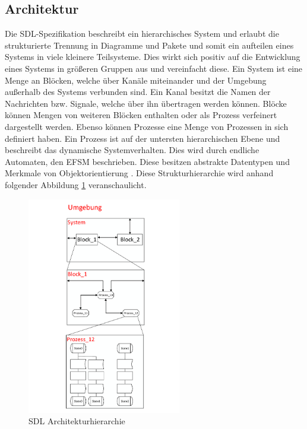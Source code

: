 \subsection{Architektur}
\label{ssc:Architektur}
Die \ac{SDL}-Spezifikation beschreibt ein hierarchisches System und erlaubt die strukturierte Trennung in Diagramme und Pakete und somit ein aufteilen eines Systems in viele kleinere Teilsysteme. Dies wirkt sich positiv auf die Entwicklung eines Systems in größeren Gruppen aus und vereinfacht diese. Ein System ist eine Menge an Blöcken, welche über Kanäle miteinander und der Umgebung außerhalb des Systems verbunden sind. Ein Kanal besitzt die Namen der Nachrichten bzw. Signale, welche über ihn übertragen werden können. Blöcke können Mengen von weiteren Blöcken enthalten oder als Prozess verfeinert dargestellt werden. Ebenso können Prozesse eine Menge von Prozessen in sich definiert haben.
Ein Prozess ist auf der untersten hierarchischen Ebene und beschreibt das dynamische Systemverhalten. Dies wird durch endliche Automaten, den \ac{EFSM} beschrieben. Diese besitzen abstrakte Datentypen und Merkmale von Objektorientierung \cite[3\psq]{ITUT100_2016}. Diese Strukturhierarchie wird anhand folgender Abbildung \ref{fig:Agenten} veranschaulicht.
 
\begin{figure}[h]
	\centering
	\includegraphics[width=0.6\textwidth]{Graphics/Agenten.pdf}
	\caption{SDL Architekturhierarchie}
	\label{fig:Agenten}
\end{figure}
\pagebreak
